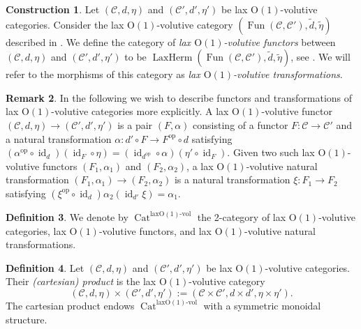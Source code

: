 \documentclass{article}
\newcommand{\opp}{\operatorname{op}}%
\newcommand{\id}{\operatorname{id}}%
\newcommand{\Cat}{\operatorname{Cat}}%
\newcommand{\Fun}{\operatorname{Fun}}%
\newcommand{\LaxHerm}{\operatorname{LaxHerm}}%
\newcommand{\Oone}{\operatorname{O(1)}}
\newcommand{\C}{\mathcal{C}}
\numberwithin{equation}{section}
\theoremstyle{definition}
\newtheorem{definition}{Definition}[subsection]
\newtheorem{construction}[definition]{Construction}
\newtheorem{remark}[definition]{Remark}
\theoremstyle{theorem}
\begin{document}
\begin{construction}
    Let $(\C,d,\eta)$ and $(\C',d',\eta')$ be lax $\Oone$-volutive categories. Consider the lax $\Oone$-volutive category $(\Fun(\C,\C'),\tilde{d},\tilde{\eta})$
    described in . We define the category of \emph{lax $\Oone$-volutive functors} between 
    $(\C,d,\eta)$ and $(\C',d',\eta')$ to be $\LaxHerm(\Fun(\C,\C'),\tilde{d},\tilde{\eta})$, see . 
    We will refer to the morphisms of this category as \emph{lax $\Oone$-volutive transformations}.
\end{construction}
\begin{remark}
    In the following we wish to describe functors and transformations of lax $\Oone$-volutive categories more explicitly. A lax $\Oone$-volutive functor 
    $(\C,d,\eta) \to (\C',d',\eta')$ is a pair $(F,\alpha)$ consisting of a functor $F \colon \C \to \C'$ and a natural transformation 
    $\alpha \colon d' \circ F \to F^{\opp} \circ d$ satisfying $(\alpha^{\opp} \circ \id_d)(\id_F \circ \eta) = (\id_{d^{\opp}} \circ \alpha)(\eta' \circ \id_F)$.
    Given two such lax $\Oone$-volutive functors $(F_1,\alpha_1)$ and $(F_2,\alpha_2)$, a lax $\Oone$-volutive natural transformation $(F_1,\alpha_1) \to (F_2,\alpha_2)$
    is a natural transformation $\xi \colon F_1 \to F_2$ satisfying $(\xi^{\opp} \circ \id_d)\alpha_2(\id_{d'}\xi) = \alpha_1$. 
\end{remark}
\begin{definition}
    We denote by $\Cat^{\text{lax}\Oone\text{-vol}}$ the 2-category of lax $\Oone$-volutive categories, lax $\Oone$-volutive functors, and lax $\Oone$-volutive 
    natural transformations. 
\end{definition}
\begin{definition}\label{Definition: product of lax Oone volutive categories}
    Let $(\C,d,\eta)$ and $(\C',d',\eta')$ be lax $\Oone$-volutive categories. Their \emph{(cartesian) product} is the lax $\Oone$-volutive category
    \begin{equation}
        (\C,d,\eta) \times (\C',d',\eta') := (\C \times \C',d \times d',\eta \times \eta').
    \end{equation}
    The cartesian product endows $\Cat^{\text{lax}\Oone\text{-vol}}$ with a symmetric monoidal structure. 
\end{definition}
\end{document}
